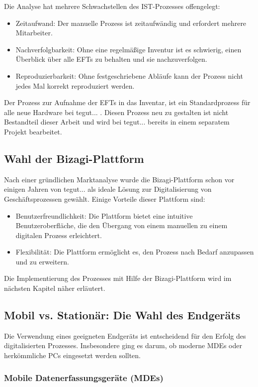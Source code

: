 \documentclass[12pt, a4paper]{article}
\begin{document}
Die Analyse hat mehrere Schwachstellen des IST-Prozesses offengelegt:
\begin{itemize}
\item Zeitaufwand: Der manuelle Prozess ist zeitaufwändig und erfordert mehrere Mitarbeiter.
\item Nachverfolgbarkeit: Ohne eine regelmäßige Inventur ist es schwierig, einen Überblick über alle EFTs zu behalten und sie nachzuverfolgen.
\item Reproduzierbarkeit: Ohne festgeschriebene Abläufe kann der Prozess nicht jedes Mal korrekt reproduziert werden.
\end{itemize}
Der Prozess zur Aufnahme der EFTs in das Inventar, ist ein Standardprozess für alle neue Hardware bei tegut... . Diesen Prozess neu zu gestalten ist nicht Bestandteil dieser
Arbeit und wird bei tegut... bereits in einem separatem Projekt bearbeitet.

\subsection{Wahl der Bizagi-Plattform}

Nach einer gründlichen Marktanalyse wurde die Bizagi-Plattform schon vor einigen Jahren von tegut... als ideale Lösung zur Digitalisierung von Geschäftsprozessen gewählt. 
Einige Vorteile dieser Plattform sind:
\begin{itemize}
\item Benutzerfreundlichkeit: Die Plattform bietet eine intuitive Benutzeroberfläche, die den Übergang von einem manuellen zu einem digitalen Prozess erleichtert.
\item Flexibilität: Die Plattform ermöglicht es, den Prozess nach Bedarf anzupassen und zu erweitern.
\end{itemize}
Die Implementierung des Prozesses mit Hilfe der Bizagi-Plattform wird im nächsten Kapitel näher erläutert.

\subsection{Mobil vs. Stationär: Die Wahl des Endgeräts}

Die Verwendung eines geeigneten Endgeräts ist entscheidend für den Erfolg des digitalisierten Prozesses. Insbesondere ging es darum, ob moderne MDEs oder herkömmliche PCs 
eingesetzt werden sollten.

\subsubsection{Mobile Datenerfassungsgeräte (MDEs)}
\end{document}
